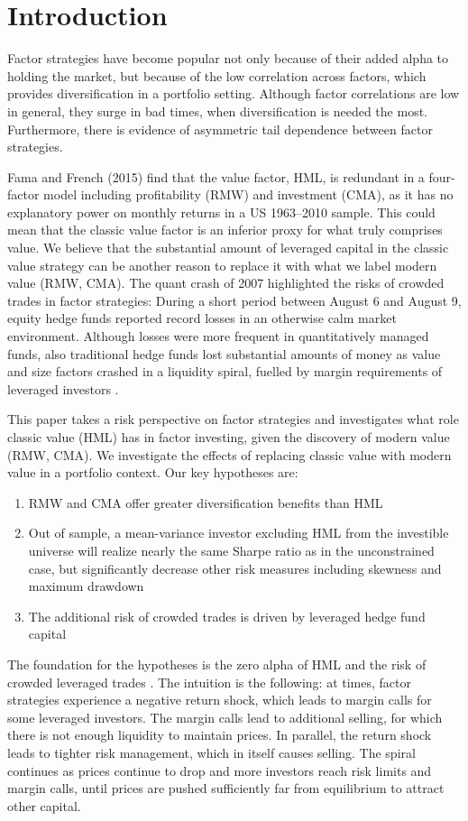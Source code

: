 \section{Introduction}
Factor strategies have become popular not only because of their added alpha to holding the market, but because of the low correlation across factors, which provides diversification in
a portfolio setting. Although factor correlations are low in
general, they surge in bad times, when diversification is needed the most. Furthermore, there is evidence of asymmetric tail dependence between factor strategies.

Fama and French (2015) find that the value factor, HML, is redundant in a four-factor model including profitability (RMW) and investment (CMA), as it has no explanatory power on monthly returns
in a US 1963–2010 sample. This could mean that the classic value factor is an inferior proxy for what truly comprises value. We believe that the substantial amount of leveraged capital in the classic value strategy can be another reason to replace it with what we label modern value (RMW, CMA). The quant crash of 2007 highlighted the risks of crowded trades in factor strategies: During a short period between August 6 and August 9, equity hedge funds reported record losses in an otherwise calm market environment. Although losses were more frequent in quantitatively managed funds, also traditional hedge funds lost substantial amounts of money as value and size factors crashed in a liquidity spiral, fuelled by margin requirements of leveraged investors \autocite{KhandaniLo2011}.

This paper takes a risk perspective on factor strategies and investigates what role classic value (HML) has in factor investing, given the discovery of modern value (RMW, CMA). We investigate the effects of replacing classic value with modern value in a portfolio context. Our key hypotheses are:
\begin{enumerate}
	\item RMW and CMA offer greater diversification benefits than HML
	\item Out of sample, a mean-variance investor excluding HML from the investible universe will realize nearly the same Sharpe ratio as in the unconstrained case, but significantly decrease other risk measures including skewness and maximum drawdown
	\item The additional risk of crowded trades is driven by leveraged hedge fund capital
\end{enumerate}
The foundation for the hypotheses is the zero alpha of HML \autocite{FF2015} and the risk of crowded leveraged trades \autocite{Brunnermeier2009}. The intuition is the following: at times, factor strategies experience a negative return shock, which leads to margin calls for some leveraged investors. The margin calls lead to additional selling, for which there is not enough liquidity to maintain prices. In parallel, the return shock leads to tighter risk management, which in itself causes selling. The spiral continues as prices continue to drop and more investors reach risk limits and margin calls, until prices are pushed sufficiently far from equilibrium to attract other capital.

